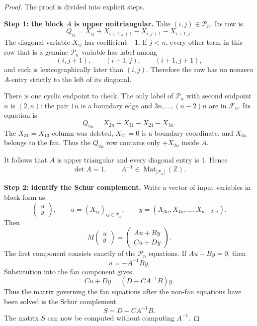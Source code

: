 \documentclass[11pt]{article}
\theoremstyle{definition}
\newcommand{\Z}{\mathbb Z}
\begin{document}
\begin{proof}
The proof is divided into explicit steps.

\medskip
\noindent\textbf{Step 1: the block $A$ is upper unitriangular.}
Take $(i,j)\in\mathcal P_n$.  Its row is
\begin{equation}\label{eq:rectangle-four-terms}
 Q_{ij}=X_{ij}+X_{i+1,j+1}-X_{i,j+1}-X_{i+1,j}.
\end{equation}
The diagonal variable $X_{ij}$ has coefficient $+1$.  If $j<n$, every other
term in this row that is a genuine $\mathcal P_n$ variable has label among
\[
 (i,j+1),\qquad(i+1,j),\qquad(i+1,j+1),
\]
and each is lexicographically later than $(i,j)$.  Therefore the row has no
nonzero $A$-entry strictly to the left of its diagonal.

There is one cyclic endpoint to check.  The only label of $\mathcal P_n$ with
second endpoint $n$ is $(2,n)$: the pair $1n$ is a boundary edge and
$3n,\ldots,(n-2)n$ are in $\mathcal F_n$.  Its equation is
\[
 Q_{2n}=X_{2n}+X_{31}-X_{21}-X_{3n}.
\]
The $X_{31}=X_{13}$ column was deleted, $X_{21}=0$ is a boundary coordinate,
and $X_{3n}$ belongs to the fan.  Thus the $Q_{2n}$ row contains only
$+X_{2n}$ inside $A$.

It follows that $A$ is upper triangular and every diagonal entry is $1$.
Hence
\begin{equation}\label{eq:det-A}
 \det A=1,
 \qquad
 A^{-1}\in\operatorname{Mat}_{|\mathcal P_n|}(\Z).
\end{equation}

\medskip
\noindent\textbf{Step 2: identify the Schur complement.}
Write a vector of input variables in block form as
\[
 \begin{pmatrix}u\\y\end{pmatrix},
 \qquad
 u=(X_{ij})_{ij\in\mathcal P_n},
 \qquad
 y=(X_{3n},X_{4n},\ldots,X_{n-2,n}).
\]
Then
\[
 M\begin{pmatrix}u\\y\end{pmatrix}
 =\begin{pmatrix}Au+By\\ Cu+Dy\end{pmatrix}.
\]
The first component consists exactly of the $\mathcal P_n$ equations.  If
$Au+By=0$, then
\begin{equation}\label{eq:u-solution}
 u=-A^{-1}By.
\end{equation}
Substitution into the fan component gives
\[
 Cu+Dy=(D-CA^{-1}B)y.
\]
Thus the matrix governing the fan equations after the non-fan equations have
been solved is the Schur complement
\begin{equation}\label{eq:Schur}
 S=D-CA^{-1}B.
\end{equation}
The matrix $S$ can now be computed without computing $A^{-1}$.


\end{proof}
\end{document}
